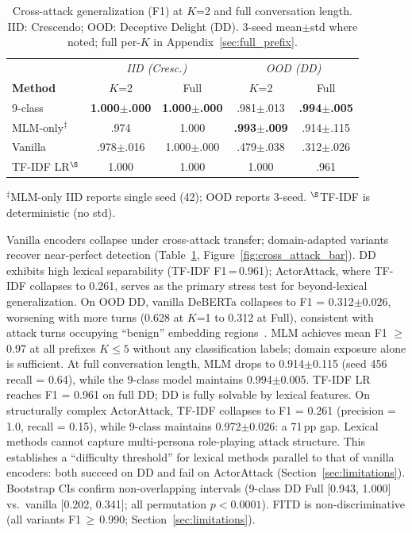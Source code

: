 \begin{table}[t]
\centering
\small
\caption{Cross-attack generalization (F1) at $K$=2 and full conversation length. IID: Crescendo; OOD: Deceptive Delight (DD). 3-seed mean$\pm$std where noted; full per-$K$ in Appendix~\ref{sec:full_prefix}.}
\label{tab:main_results}
\begin{tabular}{@{}lcc|cc@{}}
\toprule
& \multicolumn{2}{c|}{\textit{IID (Cresc.)}} & \multicolumn{2}{c}{\textit{OOD (DD)}} \\
\textbf{Method} & $K$=2 & Full & $K$=2 & Full \\
\midrule
9-class & \textbf{1.000$\pm$.000} & \textbf{1.000$\pm$.000} & .981$\pm$.013 & \textbf{.994$\pm$.005} \\
MLM-only$^{\ddagger}$ & .974 & 1.000 & \textbf{.993$\pm$.009} & .914$\pm$.115 \\
Vanilla & .978$\pm$.016 & 1.000$\pm$.000 & .479$\pm$.038 & .312$\pm$.026 \\
TF-IDF LR$^{\S}$ & 1.000 & 1.000 & 1.000 & .961 \\
\bottomrule
\end{tabular}
\vspace{-2pt}
{\footnotesize $^{\ddagger}$MLM-only IID reports single seed (42); OOD reports 3-seed. $^{\S}$TF-IDF is deterministic (no std).}
\end{table}

Vanilla encoders collapse under cross-attack transfer; domain-adapted variants recover near-perfect detection (Table~\ref{tab:main_results}, Figure~\ref{fig:cross_attack_bar}).
DD exhibits high lexical separability (TF-IDF F1\,=\,0.961); ActorAttack, where TF-IDF collapses to 0.261, serves as the primary stress test for beyond-lexical generalization.
On OOD DD, vanilla DeBERTa collapses to F1 = 0.312$\pm$0.026, worsening with more turns (0.628 at $K$=1 to 0.312 at Full), consistent with attack turns occupying ``benign'' embedding regions~\citep{bullwinkel2025repeng}.
MLM achieves mean F1 $\geq$ 0.97 at all prefixes $K \leq 5$ without any classification labels; domain exposure alone is sufficient.
At full conversation length, MLM drops to 0.914$\pm$0.115 (seed 456 recall = 0.64), while the 9-class model maintains 0.994$\pm$0.005.
TF-IDF LR reaches F1 = 0.961 on full DD; DD is fully solvable by lexical features.
On structurally complex ActorAttack, TF-IDF collapses to F1 = 0.261 (precision = 1.0, recall = 0.15), while 9-class maintains 0.972$\pm$0.026: a 71\,pp gap. Lexical methods cannot capture multi-persona role-playing attack structure. This establishes a ``difficulty threshold'' for lexical methods parallel to that of vanilla encoders: both succeed on DD and fail on ActorAttack (Section~\ref{sec:limitations}).
Bootstrap CIs confirm non-overlapping intervals (9-class DD Full [0.943, 1.000] vs.\ vanilla [0.202, 0.341]; all permutation $p < 0.0001$). FITD is non-discriminative (all variants F1\,$\geq$\,0.990; Section~\ref{sec:limitations}).

